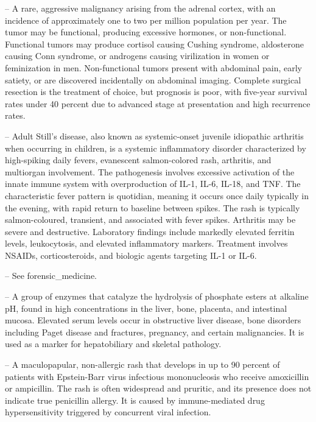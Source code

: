 -- A rare, aggressive malignancy arising from the adrenal cortex, with an incidence of approximately one to two per million population per year. The tumor may be functional, producing excessive hormones, or non-functional. Functional tumors may produce cortisol causing Cushing syndrome, aldosterone causing Conn syndrome, or androgens causing virilization in women or feminization in men. Non-functional tumors present with abdominal pain, early satiety, or are discovered incidentally on abdominal imaging. Complete surgical resection is the treatment of choice, but prognosis is poor, with five-year survival rates under 40 percent due to advanced stage at presentation and high recurrence rates.

-- Adult Still's disease, also known as systemic-onset juvenile idiopathic arthritis when occurring in children, is a systemic inflammatory disorder characterized by high-spiking daily fevers, evanescent salmon-colored rash, arthritis, and multiorgan involvement. The pathogenesis involves excessive activation of the innate immune system with overproduction of IL-1, IL-6, IL-18, and TNF. The characteristic fever pattern is quotidian, meaning it occurs once daily typically in the evening, with rapid return to baseline between spikes. The rash is typically salmon-coloured, transient, and associated with fever spikes. Arthritis may be severe and destructive. Laboratory findings include markedly elevated ferritin levels, leukocytosis, and elevated inflammatory markers. Treatment involves NSAIDs, corticosteroids, and biologic agents targeting IL-1 or IL-6.

-- See forensic\_medicine.

-- A group of enzymes that catalyze the hydrolysis of phosphate esters at alkaline pH, found in high concentrations in the liver, bone, placenta, and intestinal mucosa. Elevated serum levels occur in obstructive liver disease, bone disorders including Paget disease and fractures, pregnancy, and certain malignancies. It is used as a marker for hepatobiliary and skeletal pathology.

-- A maculopapular, non-allergic rash that develops in up to 90 percent of patients with Epstein-Barr virus infectious mononucleosis who receive amoxicillin or ampicillin. The rash is often widespread and pruritic, and its presence does not indicate true penicillin allergy. It is caused by immune-mediated drug hypersensitivity triggered by concurrent viral infection.

